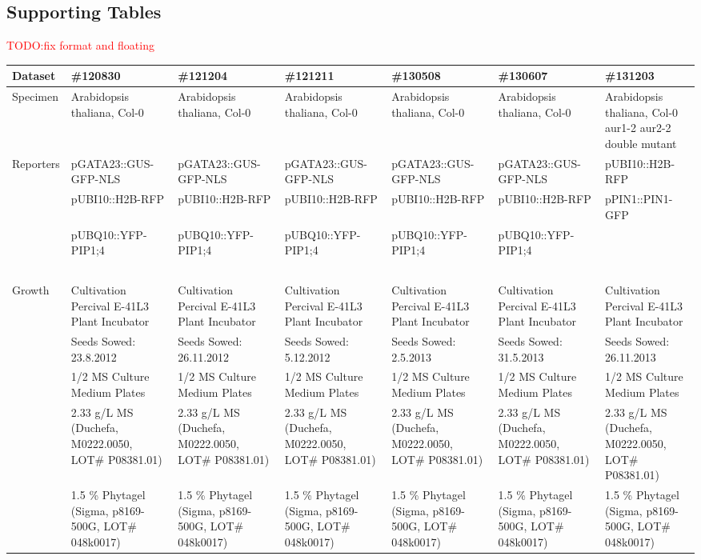 \documentclass[11pt,a4paper, final]{article}
\newcommand{\TODO}[1]{
\textcolor{red}{TODO:#1}
}
\begin{document}
\subsection{Supporting Tables}
\noindent
\setcounter{table}{0}
\makeatletter 
\renewcommand{\thetable}{S\@arabic\c@table}
\makeatother
%
\TODO{fix format and floating}
\renewcommand{\arraystretch}{1.1}
%
\tiny
\begin{longtable}{@{} l l l l l l l @{}}
\toprule
Dataset & \#120830 & \#121204 & \#121211 & \#130508 & \#130607 & \#131203\\
\midrule
Specimen & Arabidopsis thaliana, Col-0 & Arabidopsis thaliana, Col-0 & Arabidopsis thaliana, Col-0 & Arabidopsis thaliana, Col-0 & Arabidopsis thaliana, Col-0 & Arabidopsis thaliana, Col-0
aur1-2 aur2-2 double mutant\\
Reporters & pGATA23::GUS-GFP-NLS & pGATA23::GUS-GFP-NLS & pGATA23::GUS-GFP-NLS & pGATA23::GUS-GFP-NLS & pGATA23::GUS-GFP-NLS & pUBI10::H2B-RFP\\
& pUBI10::H2B-RFP & pUBI10::H2B-RFP & pUBI10::H2B-RFP & pUBI10::H2B-RFP & pUBI10::H2B-RFP & pPIN1::PIN1-GFP\\
& pUBQ10::YFP-PIP1;4 & pUBQ10::YFP-PIP1;4 & pUBQ10::YFP-PIP1;4 & pUBQ10::YFP-PIP1;4 & pUBQ10::YFP-PIP1;4 & \ \\
\ & \ & \ & \ & \ & \ & \ \\
Growth & Cultivation Percival E-41L3 Plant Incubator & Cultivation Percival E-41L3 Plant Incubator & Cultivation Percival E-41L3 Plant Incubator & Cultivation Percival E-41L3 Plant Incubator & Cultivation Percival E-41L3 Plant Incubator & Cultivation Percival E-41L3 Plant Incubator\\
\cmidrule{2-7}
& Seeds Sowed: 23.8.2012 & Seeds Sowed: 26.11.2012 & Seeds Sowed: 5.12.2012 & Seeds Sowed: 2.5.2013 & Seeds Sowed: 31.5.2013 & Seeds Sowed: 26.11.2013\\
& 1/2 MS Culture Medium Plates & 1/2 MS Culture Medium Plates & 1/2 MS Culture Medium Plates & 1/2 MS Culture Medium Plates & 1/2 MS Culture Medium Plates & 1/2 MS Culture Medium Plates\\
& 2.33 g/L MS (Duchefa, M0222.0050, LOT\# P08381.01) & 2.33 g/L MS (Duchefa, M0222.0050, LOT\# P08381.01) & 2.33 g/L MS (Duchefa, M0222.0050, LOT\# P08381.01) & 2.33 g/L MS (Duchefa, M0222.0050, LOT\# P08381.01) & 2.33 g/L MS (Duchefa, M0222.0050, LOT\# P08381.01) & 2.33 g/L MS (Duchefa, M0222.0050, LOT\# P08381.01)\\
& 1.5 \% Phytagel (Sigma, p8169-500G, LOT\# 048k0017) & 1.5 \% Phytagel (Sigma, p8169-500G, LOT\# 048k0017) & 1.5 \% Phytagel (Sigma, p8169-500G, LOT\# 048k0017) & 1.5 \% Phytagel (Sigma, p8169-500G, LOT\# 048k0017) & 1.5 \% Phytagel (Sigma, p8169-500G, LOT\# 048k0017) & 1.5 \% Phytagel (Sigma, p8169-500G, LOT\# 048k0017)\\

\end{longtable}
\end{document}
